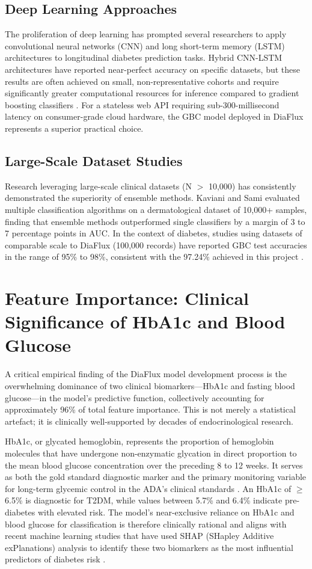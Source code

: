 \documentclass[12pt,a4paper]{report}
\begin{document}
\subsection{Deep Learning Approaches}
The proliferation of deep learning has prompted several researchers to apply convolutional neural networks (CNN) and long short-term memory (LSTM) architectures to longitudinal diabetes prediction tasks. Hybrid CNN-LSTM architectures have reported near-perfect accuracy on specific datasets, but these results are often achieved on small, non-representative cohorts and require significantly greater computational resources for inference compared to gradient boosting classifiers \cite{abdar_uncertainty}. For a stateless web API requiring sub-300-millisecond latency on consumer-grade cloud hardware, the GBC model deployed in DiaFlux represents a superior practical choice.

\subsection{Large-Scale Dataset Studies}
Research leveraging large-scale clinical datasets (N $>$ 10,000) has consistently demonstrated the superiority of ensemble methods. Kaviani and Sami \cite{kaviani_classifiers} evaluated multiple classification algorithms on a dermatological dataset of 10,000+ samples, finding that ensemble methods outperformed single classifiers by a margin of 3 to 7 percentage points in AUC. In the context of diabetes, studies using datasets of comparable scale to DiaFlux (100,000 records) have reported GBC test accuracies in the range of 95\% to 98\%, consistent with the 97.24\% achieved in this project \cite{geron_ml}.

\section{Feature Importance: Clinical Significance of HbA1c and Blood Glucose}
A critical empirical finding of the DiaFlux model development process is the overwhelming dominance of two clinical biomarkers---HbA1c and fasting blood glucose---in the model's predictive function, collectively accounting for approximately 96\% of total feature importance. This is not merely a statistical artefact; it is clinically well-supported by decades of endocrinological research.

HbA1c, or glycated hemoglobin, represents the proportion of hemoglobin molecules that have undergone non-enzymatic glycation in direct proportion to the mean blood glucose concentration over the preceding 8 to 12 weeks. It serves as both the gold standard diagnostic marker and the primary monitoring variable for long-term glycemic control in the ADA's clinical standards \cite{ada_standards_2023}. An HbA1c of $\geq$6.5\% is diagnostic for T2DM, while values between 5.7\% and 6.4\% indicate pre-diabetes with elevated risk. The model's near-exclusive reliance on HbA1c and blood glucose for classification is therefore clinically rational and aligns with recent machine learning studies that have used SHAP (SHapley Additive exPlanations) analysis to identify these two biomarkers as the most influential predictors of diabetes risk \cite{lundberg_shap}.
\end{document}
